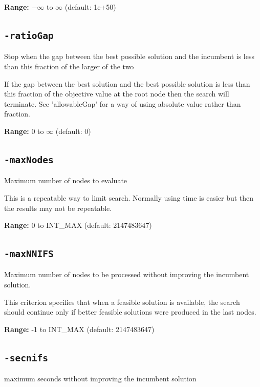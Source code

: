 \documentclass[11pt,a4paper]{article}
\begin{document}
\textbf{Range:} $-\infty$ to $\infty$ (default: 1e+50)

\subsection*{\texttt{-ratioGap}}

Stop when the gap between the best possible solution and the incumbent is less than this fraction of the larger of the two

If the gap between the best solution and the best possible solution is less than this fraction of the objective value at the root node then the search will terminate.  See 'allowableGap' for a way of using absolute value rather than fraction.

\textbf{Range:} 0 to $\infty$ (default: 0)

\subsection*{\texttt{-maxNodes}}

Maximum number of nodes to evaluate

This is a repeatable way to limit search.  Normally using time is easier but then the results may not be repeatable.

\textbf{Range:} 0 to INT\_MAX (default: 2147483647)

\subsection*{\texttt{-maxNNIFS}}

Maximum number of nodes to be processed without improving the incumbent solution.

This criterion specifies that when a feasible solution is available, the search should continue only if better feasible solutions were produced in the last nodes.

\textbf{Range:} -1 to INT\_MAX (default: 2147483647)

\subsection*{\texttt{-secnifs}}

maximum seconds without improving the incumbent solution
\end{document}
